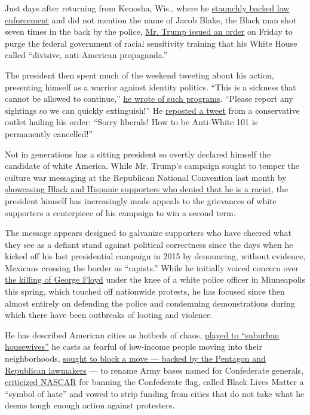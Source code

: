Just days after returning from Kenosha, Wis., where he
\href{https://www.nytimes3xbfgragh.onion/2020/09/01/us/politics/trump-conspiracy-theory-thugs-plane.html}{staunchly
backed law enforcement} and did not mention the name of Jacob Blake, the
Black man shot seven times in the back by the police,
\href{https://www.nytimes3xbfgragh.onion/2020/09/04/us/politics/trump-race-sensitivity-training.html}{Mr.
Trump issued an order} on Friday to purge the federal government of
racial sensitivity training that his White House called ``divisive,
anti-American propaganda.''

The president then spent much of the weekend tweeting about his action,
presenting himself as a warrior against identity politics. ``This is a
sickness that cannot be allowed to continue,''
\href{https://twitter.com/realDonaldTrump/status/1302212909808971776}{he
wrote of such programs}. ``Please report any sightings so we can quickly
extinguish!'' He
\href{https://twitter.com/ColumbiaBugle/status/1302214228527456264}{reposted
a tweet} from a conservative outlet hailing his order: ``Sorry liberals!
How to be Anti-White 101 is permanently cancelled!''

Not in generations has a sitting president so overtly declared himself
the candidate of white America. While Mr. Trump's campaign sought to
temper the culture war messaging at the Republican National Convention
last month by
\href{https://www.nytimes3xbfgragh.onion/2020/08/29/us/politics/rnc-trump-race-gender.html}{showcasing
Black and Hispanic supporters who denied that he is a racist}, the
president himself has increasingly made appeals to the grievances of
white supporters a centerpiece of his campaign to win a second term.

The message appears designed to galvanize supporters who have cheered
what they see as a defiant stand against political correctness since the
days when he kicked off his last presidential campaign in 2015 by
denouncing, without evidence, Mexicans crossing the border as
``rapists.'' While he initially voiced concern over
\href{https://www.nytimes3xbfgragh.onion/2020/05/31/us/george-floyd-investigation.html}{the
killing of George Floyd} under the knee of a white police officer in
Minneapolis this spring, which touched off nationwide protests, he has
focused since then almost entirely on defending the police and
condemning demonstrations during which there have been outbreaks of
looting and violence.

He has described American cities as hotbeds of chaos,
\href{https://www.nytimes3xbfgragh.onion/2020/07/30/upshot/trump-suburban-voters.html}{played
to ``suburban housewives''} he casts as fearful of low-income people
moving into their neighborhoods,
\href{https://www.nytimes3xbfgragh.onion/2020/06/10/us/politics/trump-rejects-renaming-military-bases.html}{sought
to block a move --- backed by the Pentagon and Republican lawmakers} ---
to rename Army bases named for Confederate generals,
\href{https://www.nytimes3xbfgragh.onion/2020/07/06/us/politics/trump-bubba-wallace-nascar.html}{criticized
NASCAR} for banning the Confederate flag, called Black Lives Matter a
``symbol of hate'' and vowed to strip funding from cities that do not
take what he deems tough enough action against protesters.

